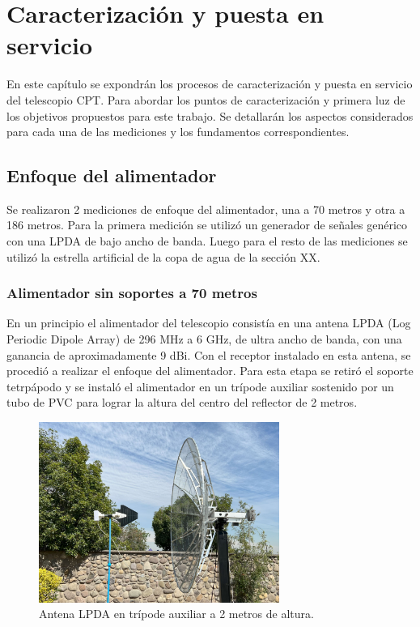 \chapter{Caracterización y puesta en servicio}

En este capítulo se expondrán los procesos de caracterización y puesta en servicio del telescopio CPT. Para abordar los puntos de caracterización y primera luz de los objetivos propuestos para este trabajo. Se detallarán los aspectos considerados para cada una de las mediciones y los fundamentos correspondientes.

\section{Enfoque del alimentador}

Se realizaron 2 mediciones de enfoque del alimentador, una a 70 metros y otra a 186 metros. Para la primera medición se utilizó un generador de señales genérico con una LPDA de bajo ancho de banda. Luego para el resto de las mediciones se utilizó la estrella artificial de la copa de agua de la sección XX.\\

\subsection{Alimentador sin soportes a 70 metros}

En un principio el alimentador del telescopio consistía en una antena LPDA (Log Periodic Dipole Array) de 296 MHz a 6 GHz, de ultra ancho de banda, con una ganancia de aproximadamente 9 dBi. Con el receptor instalado en esta antena, se procedió a realizar el enfoque del alimentador. Para esta etapa se retiró el soporte tetrpápodo y se instaló el alimentador en un trípode auxiliar sostenido por un tubo de PVC para lograr la altura del centro del reflector de 2 metros.\\

\begin{figure}
    \centering
    \includegraphics[width=0.7\textwidth]{img/enfoque1}
    \caption{Antena LPDA en trípode auxiliar a 2 metros de altura.}
    \label{fig:antena_lpda}
\end{figure}

